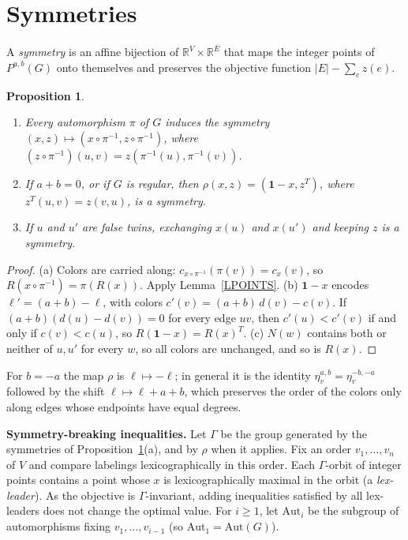 \documentclass[a4paper,11pt]{article}
\newcommand{\Eb}{\overline{E}}
\newcommand{\etav}{\eta_v^{a,b}}
\newtheorem{prop}{Proposition}
\theoremstyle{definition}
\begin{document}
\section{Symmetries} \label{SSYM}

A \emph{symmetry} is an affine bijection of $\mathbb{R}^V \times \mathbb{R}^{\Eb}$ that maps the integer points of $P^{a,b}(G)$ onto themselves and preserves the
objective function $|E| - \sum_e z(e)$.

\begin{prop} \label{PSYM}
\begin{enumerate}
\item[(a)] Every automorphism $\pi$ of $G$ induces the symmetry $(x,z) \mapsto (x \circ \pi^{-1}, z \circ \pi^{-1})$, where
$(z \circ \pi^{-1})(u,v) = z(\pi^{-1}(u), \pi^{-1}(v))$.
\item[(b)] If $a + b = 0$, or if $G$ is regular, then $\rho(x,z) = (\mathbf{1} - x, z^T)$, where $z^T(u,v) = z(v,u)$, is a symmetry.
\item[(c)] If $u$ and $u'$ are false twins, exchanging $x(u)$ and $x(u')$ and keeping $z$ is a symmetry.
\end{enumerate}
\end{prop}
\begin{proof}
(a) Colors are carried along: $c_{x \circ \pi^{-1}}(\pi(v)) = c_x(v)$, so $R(x \circ \pi^{-1}) = \pi(R(x))$. Apply Lemma~\ref{LPOINTS}.
(b) $\mathbf{1} - x$ encodes $\ell' = (a + b) - \ell$, with colors $c'(v) = (a+b)\,d(v) - c(v)$. If $(a+b)(d(u) - d(v)) = 0$ for every edge $uv$, then
$c'(u) < c'(v)$ if and only if $c(v) < c(u)$, so $R(\mathbf{1} - x) = R(x)^T$.
(c) $N(w)$ contains both or neither of $u, u'$ for every $w$, so all colors are unchanged, and so is $R(x)$.
\end{proof}

For $b = -a$ the map $\rho$ is $\ell \mapsto -\ell$; in general it is the identity $\etav = \eta_v^{-b,-a}$ followed by the shift
$\ell \mapsto \ell + a + b$, which preserves the order of the colors only along edges whose endpoints have equal degrees.

\medskip

\noindent\textbf{Symmetry-breaking inequalities.} Let $\Gamma$ be the group generated by the symmetries of Proposition~\ref{PSYM}(a), and by $\rho$
when it applies. Fix an order $v_1, \ldots, v_n$ of $V$ and compare labelings lexicographically in this order. Each $\Gamma$-orbit of integer points
contains a point whose $x$ is lexicographically maximal in the orbit (a \emph{lex-leader}). As the objective is $\Gamma$-invariant, adding
inequalities satisfied by all lex-leaders does not change the optimal value. For $i \geq 1$, let $\mathrm{Aut}_i$ be the subgroup of automorphisms
fixing $v_1, \ldots, v_{i-1}$ (so $\mathrm{Aut}_1 = \mathrm{Aut}(G)$).
\end{document}

